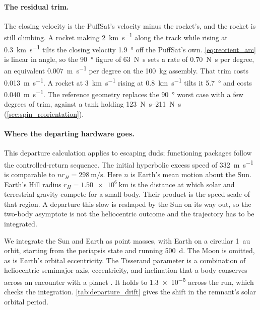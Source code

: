 \documentclass{article}
\begin{document}
\paragraph{The residual trim.}
The closing velocity is the PuffSat's velocity minus the rocket's, and the rocket is still climbing. A rocket making \SI{2}{\kilo\meter\per\second} along the track while rising at \SI{0.3}{\kilo\meter\per\second} tilts the closing velocity \SI{1.9}{\degree} off the PuffSat's own. \autoref{eq:reorient_arc} is linear in angle, so the \SI{90}{\degree} figure of \SI{63}{\newton\second} sets a rate of \SI{0.70}{\newton\second} per degree, an equivalent \SI{0.007}{\meter\per\second} per degree on the \SI{100}{\kilo\gram} assembly. That trim costs \SI{0.013}{\meter\per\second}. A rocket at \SI{3}{\kilo\meter\per\second} rising at \SI{0.8}{\kilo\meter\per\second} tilts it \SI{5.7}{\degree} and costs \SI{0.040}{\meter\per\second}. The reference geometry replaces the \SI{90}{\degree} worst case with a few degrees of trim, against a tank holding \SIrange{123}{211}{\newton\second} (\autoref{sec:spin_reorientation}).

\paragraph{Where the departing hardware goes.}
This departure calculation applies to escaping duds; functioning packages follow the controlled-return sequence. The initial hyperbolic excess speed of \SI{332}{\meter\per\second} is comparable to $n r_H = \SI{298}{\meter\per\second}$. Here $n$ is Earth's mean motion about the Sun. Earth's Hill radius $r_H = \SI{1.50e6}{\kilo\meter}$ is the distance at which solar and terrestrial gravity compete for a small body. Their product is the speed scale of that region. A departure this slow is reshaped by the Sun on its way out, so the two-body asymptote is not the heliocentric outcome and the trajectory has to be integrated.

We integrate the Sun and Earth as point masses, with Earth on a circular \SI{1}{\astronomicalunit} orbit, starting from the periapsis state and running \SI{500}{\day}. The Moon is omitted, as is Earth's orbital eccentricity. The Tisserand parameter is a combination of heliocentric semimajor axis, eccentricity, and inclination that a body conserves across an encounter with a planet \cite{vallado_astrodynamics}. It holds to \num{1.3e-5} across the run, which checks the integration. \autoref{tab:departure_drift} gives the shift in the remnant's solar orbital period.
\end{document}
